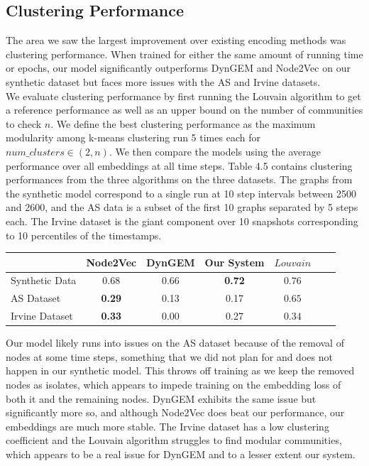 \documentclass[12pt,twoside]{report}
\begin{document}
\begin{center}
\begin{minipage}{0.45\linewidth}
\end{minipage}%
\end{center}


\subsection{Clustering Performance}

The area we saw the largest improvement over existing encoding methods was clustering performance. When trained for either the same amount of running time or epochs, our model significantly outperforms DynGEM and Node2Vec on our synthetic dataset but faces more issues with the AS \cite{leskovec2005graphs} and Irvine \cite{panzarasa2009patterns} datasets. \\

We evaluate clustering performance by first running the Louvain algorithm to get a reference performance as well as an upper bound on the number of communities to check $n$. We define the best clustering performance as the maximum modularity among k-means clustering run 5 times each for $num\_clusters \in (2, n)$. We then compare the models using the average performance over all embeddings at all time steps. Table 4.5 contains clustering performances from the three algorithms on the three datasets. The graphs from the synthetic model correspond to a single run at 10 step intervals between 2500 and 2600, and the AS data is a subset of the first 10 graphs separated by 5 steps each. The Irvine dataset is the giant component over 10 snapshots corresponding to 10 percentiles of the timestamps.  \\

\begin{center}
\begin{tabular}{l*{5}{c}r}
              & Node2Vec & DynGEM & Our System & $Louvain$ \\
\hline
Synthetic Data    & 0.68 & 0.66 & \textbf{0.72} & $0.76$  \\
AS Dataset   & \textbf{0.29} & 0.13 & 0.17 & $0.65$  \\
Irvine Dataset   & \textbf{0.33} & 0.00 & 0.27 & $0.34$  \\
\end{tabular}
\end{center} 

Our model likely runs into issues on the AS dataset because of the removal of nodes at some time steps, something that we did not plan for and does not happen in our synthetic model. This throws off training as we keep the removed nodes as isolates, which appears to impede training on the embedding loss of both it and the remaining nodes. DynGEM exhibits the same issue but significantly more so, and although Node2Vec does beat our performance, our embeddings are much more stable. The Irvine dataset has a low clustering coefficient and the Louvain algorithm struggles to find modular communities, which appears to be a real issue for DynGEM and to a lesser extent our system. \\
\end{document}
